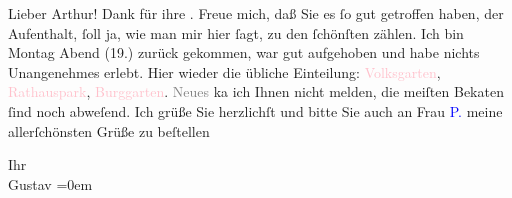 \pstart{}Lieber Arthur!\pend\vspace{0.5em}
\pstart
           Dank für ihre \label{K_L04244-2v}\label{K_L04244-2}. Freue mich, daß Sie es ſo gut getroffen haben, der Aufenthalt,
               ſoll ja, wie man mir hier ſagt, zu den ſchönſten zählen. Ich bin Montag
               Abend (19.) zurück gekommen, war gut aufgehoben und habe nichts
               Unangenehmes erlebt. Hier wieder die übliche Einteilung: \textcolor{pink}{Volksgarten}\ledrightnote{\textcolor{pink}{Volksgarten}}, \textcolor{pink}{Rathauspark}\ledrightnote{\textcolor{pink}{Rathauspark}}, \textcolor{pink}{Burggarten}\ledrightnote{\textcolor{pink}{Burggarten}}. \textcolor{gray}{Neues} ka{\geminationn}
               ich Ihnen nicht melden, die meiſten Beka{\geminationn}ten ſind noch
               abweſend. Ich grüße Sie {\pb}herzlichſt und
               bitte Sie auch an Frau \textcolor{blue}{P.}\ledrightnote{\textcolor{blue}{Clara Katharina Pollaczek}} meine allerſchönsten Grüße zu
               beſtellen\pend
           
\pstart
           Ihr{\\[\baselineskip]}\spacefill\mbox{Gustav}\pend
           \leftskip=0em{}\endnumbering{}
\begin{anhang}
\end{anhang}\newcommand{\dateiname}{L04244}\newcommand{\titel}{Gustav Schwarzkopf an Arthur Schnitzler, 27. 8. 1929}\newcommand{\editorInnen}{Herausgegeben von Jahnke, SelmaMüller, Martin Anton}
